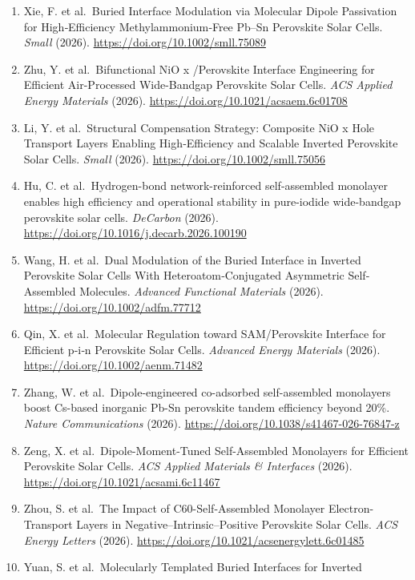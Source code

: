 \documentclass[
  11pt,
]{article}
\begin{document}
\begin{enumerate}
  (2026). \url{https://doi.org/10.1021/acsaem.6c01436}
\item
  Xie, F. et al.~Buried Interface Modulation via Molecular Dipole
  Passivation for High‐Efficiency Methylammonium‐Free Pb--Sn Perovskite
  Solar Cells. \emph{Small} (2026).
  \url{https://doi.org/10.1002/smll.75089}
\item
  Zhu, Y. et al.~Bifunctional NiO x /Perovskite Interface Engineering
  for Efficient Air-Processed Wide-Bandgap Perovskite Solar Cells.
  \emph{ACS Applied Energy Materials} (2026).
  \url{https://doi.org/10.1021/acsaem.6c01708}
\item
  Li, Y. et al.~Structural Compensation Strategy: Composite NiO x Hole
  Transport Layers Enabling High‐Efficiency and Scalable Inverted
  Perovskite Solar Cells. \emph{Small} (2026).
  \url{https://doi.org/10.1002/smll.75056}
\item
  Hu, C. et al.~Hydrogen-bond network-reinforced self-assembled
  monolayer enables high efficiency and operational stability in
  pure-iodide wide-bandgap perovskite solar cells. \emph{DeCarbon}
  (2026). \url{https://doi.org/10.1016/j.decarb.2026.100190}
\item
  Wang, H. et al.~Dual Modulation of the Buried Interface in Inverted
  Perovskite Solar Cells With Heteroatom‐Conjugated Asymmetric
  Self‐Assembled Molecules. \emph{Advanced Functional Materials} (2026).
  \url{https://doi.org/10.1002/adfm.77712}
\item
  Qin, X. et al.~Molecular Regulation toward SAM/Perovskite Interface
  for Efficient p‐i‐n Perovskite Solar Cells. \emph{Advanced Energy
  Materials} (2026). \url{https://doi.org/10.1002/aenm.71482}
\item
  Zhang, W. et al.~Dipole-engineered co-adsorbed self-assembled
  monolayers boost Cs-based inorganic Pb-Sn perovskite tandem efficiency
  beyond 20\%. \emph{Nature Communications} (2026).
  \url{https://doi.org/10.1038/s41467-026-76847-z}
\item
  Zeng, X. et al.~Dipole-Moment-Tuned Self-Assembled Monolayers for
  Efficient Perovskite Solar Cells. \emph{ACS Applied Materials \&
  Interfaces} (2026). \url{https://doi.org/10.1021/acsami.6c11467}
\item
  Zhou, S. et al.~The Impact of C60-Self-Assembled Monolayer
  Electron-Transport Layers in Negative--Intrinsic--Positive Perovskite
  Solar Cells. \emph{ACS Energy Letters} (2026).
  \url{https://doi.org/10.1021/acsenergylett.6c01485}
\item
  Yuan, S. et al.~Molecularly Templated Buried Interfaces for Inverted

\end{enumerate}
\end{document}
